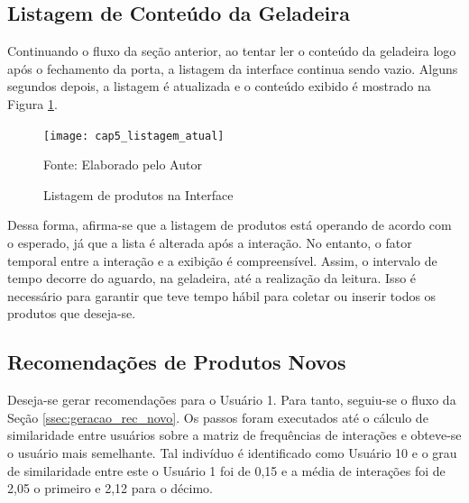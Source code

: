 \subsection{Listagem de Conteúdo da Geladeira}
 
Continuando o fluxo da seção anterior, ao tentar ler o conteúdo da geladeira logo após o fechamento da porta, a listagem da interface continua sendo vazio. Alguns segundos depois, a listagem é atualizada e o conteúdo exibido é mostrado na Figura \ref{fig:cap5_listagem_atual}.


\begin{figure}[htb]
    \caption{Listagem de produtos na Interface}
    \label{fig:cap5_listagem_atual}
    \texttt{[image: cap5\_listagem\_atual]}
    
    \footnotesize{Fonte: Elaborado pelo Autor}
\end{figure}
 
Dessa forma, afirma-se que a listagem de produtos está operando de acordo com o esperado, já que a lista é alterada após a interação. No entanto, o fator temporal entre a interação e a exibição é compreensível. Assim, o intervalo de tempo decorre do aguardo, na geladeira, até a realização da leitura. Isso é necessário para garantir que teve tempo hábil para coletar ou inserir todos os produtos que deseja-se.


\subsection{Recomendações de Produtos Novos}

Deseja-se gerar recomendações para o Usuário 1. Para tanto, seguiu-se o fluxo da Seção \ref{ssec:geracao_rec_novo}. Os passos foram executados até o cálculo de similaridade entre usuários sobre a matriz de frequências de interações e obteve-se o usuário mais semelhante. Tal indivíduo é identificado como Usuário 10 e o grau de similaridade entre este o Usuário 1 foi de 0,15 e a média de interações foi de 2,05 o primeiro e 2,12 para o décimo.


